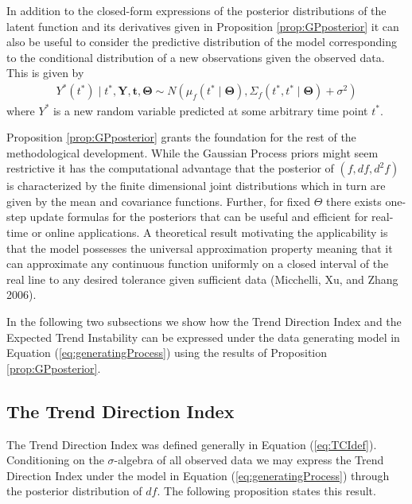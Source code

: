 \documentclass[
  11pt,
]{article}
\theoremstyle{nonumberplain}
\begin{document}
In addition to the closed-form expressions of the posterior
distributions of the latent function and its derivatives given in
Proposition \ref{prop:GPposterior} it can also be useful to consider the
predictive distribution of the model corresponding to the conditional
distribution of a new observations given the observed data. This is
given by \begin{align}
Y^\ast(t^\ast) \mid t^\ast, \mathbf{Y}, \mathbf{t}, \bm{\Theta} \sim N\left(\mu_{f}(t^\ast \mid \bm{\Theta}), \Sigma_{f}(t^\ast, t^\ast \mid \bm{\Theta}) + \sigma^2\right)\label{eq:PPD}
\end{align} where \(Y^\ast\) is a new random variable predicted at some
arbitrary time point \(t^\ast\).

Proposition \ref{prop:GPposterior} grants the foundation for the rest of
the methodological development. While the Gaussian Process priors might
seem restrictive it has the computational advantage that the posterior
of \((f, df, d^2\!f)\) is characterized by the finite dimensional joint
distributions which in turn are given by the mean and covariance
functions. Further, for fixed \(\Theta\) there exists one-step update
formulas for the posteriors that can be useful and efficient for
real-time or online applications. A theoretical result motivating the
applicability is that the model possesses the universal approximation
property meaning that it can approximate any continuous function
uniformly on a closed interval of the real line to any desired tolerance
given sufficient data (Micchelli, Xu, and Zhang 2006).

In the following two subsections we show how the Trend Direction Index
and the Expected Trend Instability can be expressed under the data
generating model in Equation (\ref{eq:generatingProcess}) using the
results of Proposition \ref{prop:GPposterior}.

\hypertarget{the-trend-direction-index}{%
\subsection{The Trend Direction Index}\label{the-trend-direction-index}}

The Trend Direction Index was defined generally in Equation
(\ref{eq:TCIdef}). Conditioning on the \(\sigma\)-algebra of all
observed data we may express the Trend Direction Index under the model
in Equation (\ref{eq:generatingProcess}) through the posterior
distribution of \(df\). The following proposition states this result.
\end{document}
